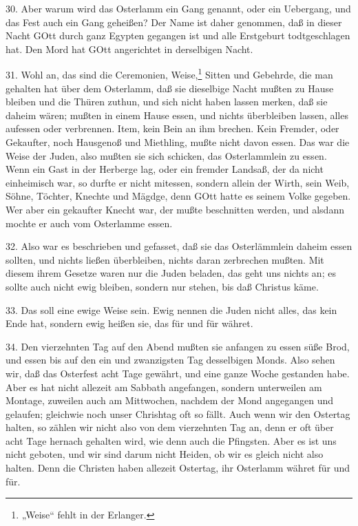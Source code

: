 30. Aber warum wird das Osterlamm ein Gang genannt, oder ein Uebergang, und das Fest auch ein Gang geheißen? Der Name ist daher genommen, daß in dieser Nacht GOtt durch ganz Egypten gegangen ist und alle Erstgeburt todtgeschlagen hat. Den Mord hat GOtt angerichtet in derselbigen Nacht.

31. Wohl an, das sind die Ceremonien, Weise,\footnote{„Weise“ fehlt in der Erlanger.} Sitten und Gebehrde, die man gehalten hat über dem Osterlamm, daß sie dieselbige Nacht mußten zu Hause bleiben und die Thüren zuthun, und sich nicht haben lassen merken, daß sie daheim wären; mußten in einem Hause essen, und nichts überbleiben lassen, alles aufessen oder verbrennen. Item, kein Bein an ihm brechen. Kein Fremder, oder Gekaufter, noch Hausgenoß und Miethling, mußte nicht davon essen. Das war die Weise der Juden, also mußten sie sich schicken, das Osterlammlein zu essen. Wenn ein Gast in der Herberge lag, oder ein fremder Landsaß, der da nicht einheimisch war, so durfte er nicht mitessen, sondern allein der Wirth, sein Weib, Söhne, Töchter, Knechte und Mägdge, denn GOtt hatte es seinem Volke gegeben. Wer aber ein gekaufter Knecht war, der mußte beschnitten werden, und alsdann mochte er auch vom Osterlamme essen.

32. Also war es beschrieben und gefasset, daß sie das Osterlämmlein daheim essen sollten, und nichts ließen überbleiben, nichts daran zerbrechen mußten. Mit diesem ihrem Gesetze waren nur die Juden beladen, das geht uns nichts an; es sollte auch nicht ewig bleiben, sondern nur stehen, bis daß Christus käme.

33. Das soll eine ewige Weise sein. Ewig nennen die Juden nicht alles, das kein Ende hat, sondern ewig heißen sie, das für und für währet.

34. Den vierzehnten Tag auf den Abend mußten sie anfangen zu essen süße Brod, und essen bis auf den ein und zwanzigsten Tag desselbigen Monds. Also sehen wir, daß das Osterfest acht Tage gewährt, und eine ganze Woche gestanden habe. Aber es hat nicht allezeit am Sabbath angefangen, sondern unterweilen am Montage, zuweilen auch am Mittwochen, nachdem der Mond angegangen und gelaufen; gleichwie noch unser Chrishtag oft so fällt. Auch wenn wir den Ostertag halten, so zählen wir nicht also von dem vierzehnten Tag an, denn er oft über acht Tage hernach gehalten wird, wie denn auch die Pfingsten. Aber es ist uns nicht geboten, und wir sind darum nicht Heiden, ob wir es gleich nicht also halten. Denn die Christen haben allezeit Ostertag, ihr Osterlamm währet für und für.

